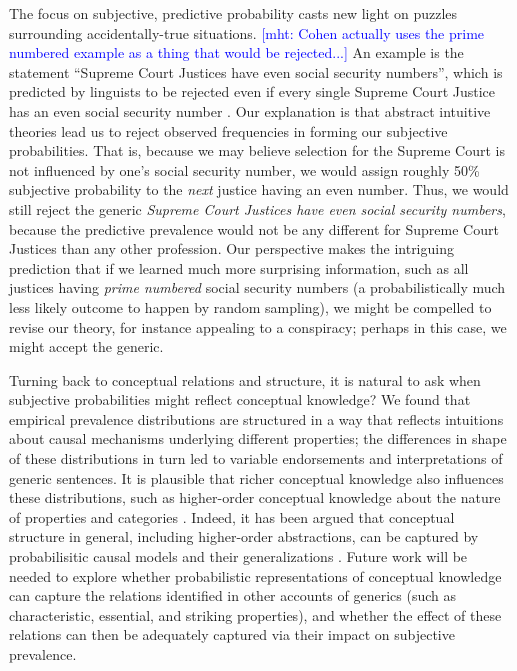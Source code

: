 \documentclass[12pt,letterpaper]{article}
\newcommand{\ndg}[1]{\textcolor{Green}{[ndg: #1]}}
\newcommand{\mht}[1]{\textcolor{Blue}{[mht: #1]}}
\begin{document}
The focus on subjective, predictive probability casts new light on puzzles surrounding accidentally-true situations.
\mht{Cohen actually uses the prime numbered example as a thing that would be rejected...}
An example is the statement ``Supreme Court Justices have even social security numbers'', which is predicted by linguists to be rejected even if every single Supreme Court Justice has an even social security number \cite{Cohen1999}.
Our explanation is that abstract intuitive theories lead us to reject observed frequencies in forming our subjective probabilities.
That is, because we may believe selection for the Supreme Court is not influenced by one's social security number, we would assign roughly 50\% subjective probability to the \emph{next} justice having an even number.
Thus, we would still reject the generic \emph{Supreme Court Justices have even social security numbers}, because the predictive prevalence would not be any different for Supreme Court Justices than any other profession. 
Our perspective makes the intriguing prediction that if we learned much more surprising information, such as all justices having \emph{prime numbered} social security numbers (a probabilistically much less likely outcome to happen by random sampling), we might be compelled to revise our theory, for instance appealing to a conspiracy; perhaps in this case, we might accept the generic.

Turning back to conceptual relations and structure, it is natural to ask when subjective probabilities might reflect conceptual knowledge?
We found that empirical prevalence distributions are structured in a way that reflects intuitions about causal mechanisms underlying different properties; the differences in shape of these distributions in turn led to variable endorsements and interpretations of generic sentences. 
It is plausible that richer conceptual knowledge also influences these distributions, such as higher-order conceptual knowledge about the nature of properties and categories \cite{Gelman2003,Keil1992}. 
Indeed, it has been argued that conceptual structure in general, including higher-order abstractions, can be captured by probabilisitic causal models and their generalizations \cite{pearl1988probabilistic, Gopnik2003theory, Goodmanconcepts}. 
Future work will be needed to explore whether probabilistic representations of conceptual knowledge can capture the relations identified in other accounts of generics (such as characteristic, essential, and striking properties), and whether the effect of these relations can then be adequately captured via their impact on subjective prevalence.
\end{document}
